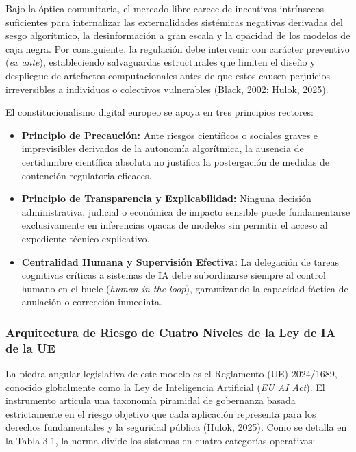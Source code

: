 Bajo la óptica comunitaria, el mercado libre carece de incentivos intrínsecos suficientes para internalizar las externalidades sistémicas negativas derivadas del sesgo algorítmico, la desinformación a gran escala y la opacidad de los modelos de caja negra. Por consiguiente, la regulación debe intervenir con carácter preventivo (\textit{ex ante}), estableciendo salvaguardas estructurales que limiten el diseño y despliegue de artefactos computacionales antes de que estos causen perjuicios irreversibles a individuos o colectivos vulnerables (Black, 2002; Hulok, 2025).

El constitucionalismo digital europeo se apoya en tres principios rectores:
\begin{itemize}[leftmargin=2em]
    \item \textbf{Principio de Precaución:} Ante riesgos científicos o sociales graves e imprevisibles derivados de la autonomía algorítmica, la ausencia de certidumbre científica absoluta no justifica la postergación de medidas de contención regulatoria eficaces.
    \item \textbf{Principio de Transparencia y Explicabilidad:} Ninguna decisión administrativa, judicial o económica de impacto sensible puede fundamentarse exclusivamente en inferencias opacas de modelos sin permitir el acceso al expediente técnico explicativo.
    \item \textbf{Centralidad Humana y Supervisión Efectiva:} La delegación de tareas cognitivas críticas a sistemas de IA debe subordinarse siempre al control humano en el bucle (\textit{human-in-the-loop}), garantizando la capacidad fáctica de anulación o corrección inmediata.
\end{itemize}

\subsubsection{Arquitectura de Riesgo de Cuatro Niveles de la Ley de IA de la UE}

La piedra angular legislativa de este modelo es el Reglamento (UE) 2024/1689, conocido globalmente como la Ley de Inteligencia Artificial (\textit{EU AI Act}). El instrumento articula una taxonomía piramidal de gobernanza basada estrictamente en el riesgo objetivo que cada aplicación representa para los derechos fundamentales y la seguridad pública (Hulok, 2025). Como se detalla en la Tabla 3.1, la norma divide los sistemas en cuatro categorías operativas:

